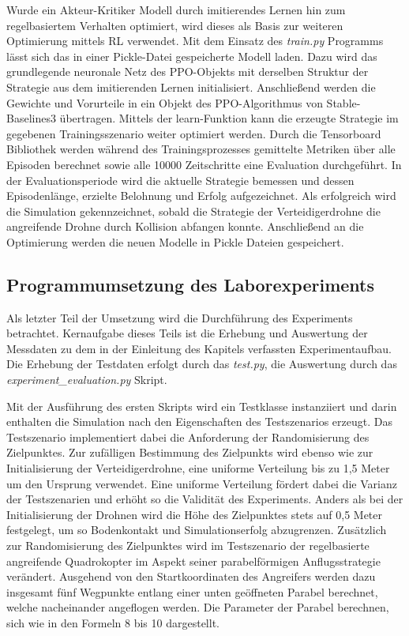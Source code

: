 Wurde ein Akteur-Kritiker Modell durch imitierendes Lernen hin zum regelbasiertem Verhalten optimiert, wird dieses als Basis zur weiteren Optimierung mittels RL verwendet.
Mit dem Einsatz des \textit{train.py} Programms lässt sich das in einer Pickle-Datei gespeicherte Modell laden.
Dazu wird das grundlegende neuronale Netz des PPO-Objekts mit derselben Struktur der Strategie aus dem imitierenden Lernen initialisiert. 
Anschließend werden die Gewichte und Vorurteile in ein Objekt des PPO-Algorithmus von Stable-Baselines3 übertragen.
Mittels der learn-Funktion kann die erzeugte Strategie im gegebenen Trainingsszenario weiter optimiert werden.
Durch die Tensorboard Bibliothek werden während des Trainingsprozesses gemittelte Metriken über alle Episoden berechnet sowie alle 10000 Zeitschritte eine Evaluation durchgeführt.
In der Evaluationsperiode wird die aktuelle Strategie bemessen und dessen Episodenlänge, erzielte Belohnung und Erfolg aufgezeichnet.
Als erfolgreich wird die Simulation gekennzeichnet, sobald die Strategie der Verteidigerdrohne die angreifende Drohne durch Kollision abfangen konnte.
Anschließend an die Optimierung werden die neuen Modelle in Pickle Dateien gespeichert. 

\subsection{Programmumsetzung des Laborexperiments}

Als letzter Teil der Umsetzung wird die Durchführung des Experiments betrachtet.
Kernaufgabe dieses Teils ist die Erhebung und Auswertung der Messdaten zu dem in der Einleitung des Kapitels verfassten Experimentaufbau.
Die Erhebung der Testdaten erfolgt durch das \textit{test.py}, die Auswertung durch das \textit{experiment\_evaluation.py} Skript.

Mit der Ausführung des ersten Skripts wird ein Testklasse instanziiert und darin enthalten die Simulation nach den Eigenschaften des Testszenarios erzeugt.
Das Testszenario implementiert dabei die Anforderung der Randomisierung des Zielpunktes.
Zur zufälligen Bestimmung des Zielpunkts wird ebenso wie zur Initialisierung der Verteidigerdrohne, eine uniforme Verteilung bis zu 1,5 Meter um den Ursprung verwendet.
Eine uniforme Verteilung fördert dabei die Varianz der Testszenarien und erhöht so die Validität des Experiments.
Anders als bei der Initialisierung der Drohnen wird die Höhe des Zielpunktes stets auf 0,5 Meter festgelegt, um so Bodenkontakt und Simulationserfolg abzugrenzen.
Zusätzlich zur Randomisierung des Zielpunktes wird im Testszenario der regelbasierte angreifende Quadrokopter im Aspekt seiner parabelförmigen Anflugsstrategie verändert.
Ausgehend von den Startkoordinaten des Angreifers werden dazu insgesamt fünf Wegpunkte entlang einer unten geöffneten Parabel berechnet, welche nacheinander angeflogen werden.
Die Parameter der Parabel berechnen, sich wie in den Formeln 8 bis 10 dargestellt.

